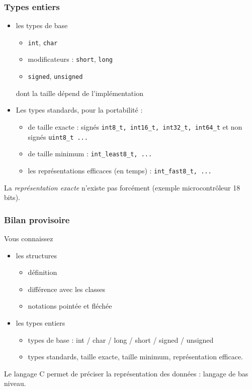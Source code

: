 \documentclass[]{beamer}
\begin{document}
\begin{frame}
  \frametitle{Types entiers}
  \begin{itemize}
  \item les \alert{types de base}
    \begin{itemize}
    \item \texttt{int}, \texttt{char}
    \item modificateurs : \texttt{short},  \texttt{long}
    \item \texttt{signed}, \texttt{unsigned}
    \end{itemize}
    dont la taille dépend de l'implémentation
  \item Les \alert{types standards}, pour la portabilité :
    \begin{itemize}
    \item de \alert{taille exacte} : 
      signés \texttt{int8\_t, int16\_t, int32\_t, int64\_t}
      et non signés \texttt{uint8\_t ...} 
    \item de \alert{taille minimum} : 	\texttt{int\_least8\_t, ...}
    \item les \alert{représentations efficaces} (en temps) : \texttt{int\_fast8\_t, ...}
    \end{itemize}
  \end{itemize}
    La \emph{représentation exacte} n'existe pas forcément (exemple
    microcontrôleur 18 bits).

\end{frame}


\begin{frame}
  \frametitle{Bilan provisoire}
Vous connaissez
\begin{itemize}
\item les \alert{structures}
\begin{itemize}
\item définition
\item différence avec les classes
\item notations pointée et fléchée
\end{itemize}
\item les \alert{types entiers}
\begin{itemize}
\item \alert{types de base} : int / char / long / short / signed / unsigned
\item \alert{types standards}, taille exacte, taille minimum, représentation efficace.
\end{itemize}
\end{itemize}

Le langage C permet de préciser la représentation des données : langage de bas niveau.
\end{frame}
\end{document}
